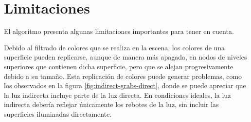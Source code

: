\section{Limitaciones}

El algoritmo presenta algunas limitaciones importantes para tener en cuenta.

Debido al filtrado de colores que se realiza en la escena, los colores de una superficie pueden replicarse, aunque de manera más apagada, en nodos de niveles superiores que contienen dicha superficie, pero que se alejan progresivamente debido a su tamaño.
Esta replicación de colores puede generar problemas, como los observados en la figura \ref{fig:indirect-grabs-direct}, donde se puede apreciar que la luz indirecta incluye parte de la luz directa.
En condiciones ideales, la luz indirecta debería reflejar únicamente los rebotes de la luz, sin incluir las superficies iluminadas directamente.

